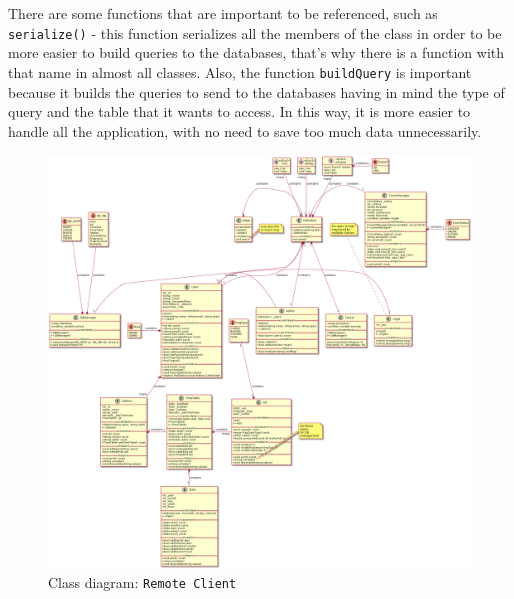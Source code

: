 There are some functions that are important to be referenced, such as \texttt{serialize()} - this function serializes all the members of the class in order to be more easier to build queries to the databases, that's why there is a function with that name in almost all classes.
Also, the function \texttt{buildQuery} is important because it builds the queries to send to the databases having in mind the type of query and the table that it wants to access. In this way, it is more easier to handle all the application, with no need to save too much data unnecessarily.  
%
\begin{figure}[htb!]
\centering
    \includegraphics[width=1.0\columnwidth]{./img/class-diag-rc-hugo.png}
  \caption{Class diagram: \texttt{Remote Client}}%
\label{fig:class-diag-rc}
\end{figure}
